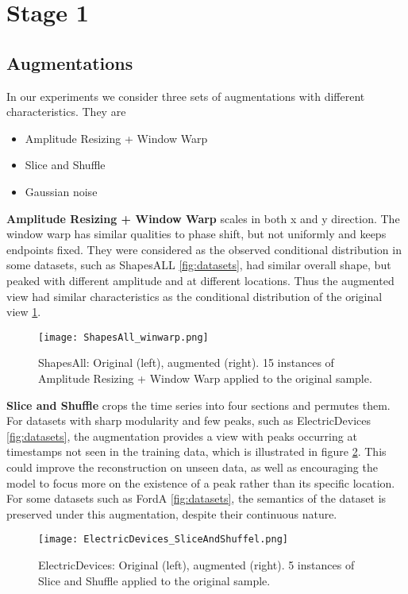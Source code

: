 \documentclass[../../thesis.tex]{subfiles}
\begin{document}
\section{Stage 1}


\subsection{Augmentations}
In our experiments we consider three sets of augmentations with different characteristics. They are
\begin{itemize}
    \item Amplitude Resizing + Window Warp
    \item Slice and Shuffle
    \item Gaussian noise
\end{itemize}

\textbf{Amplitude Resizing + Window Warp} scales in both x and y direction. The window warp has similar qualities to phase shift, but not uniformly and keeps endpoints fixed. They were considered as the observed conditional distribution in some datasets, such as ShapesALL \ref{fig:datasets}, had similar overall shape, but peaked with different amplitude and at different locations. Thus the augmented view had similar characteristics as the conditional distribution of the original view \ref{fig:ShapesAll_winwarp}. \newline

\begin{figure}[h]
    \centering
    \texttt{[image: ShapesAll\_winwarp.png]}
    \caption{ShapesAll: Original (left), augmented (right). 15 instances of Amplitude Resizing + Window Warp applied to the original sample.}
    \label{fig:ShapesAll_winwarp}
\end{figure}

\textbf{Slice and Shuffle} crops the time series into four sections and permutes them. For datasets with sharp modularity and few peaks, such as ElectricDevices \ref{fig:datasets}, the augmentation provides a view with peaks occurring at timestamps not seen in the training data, which is illustrated in figure \ref{fig:ElectricDevices_SliceAndShuffel}. This could improve the reconstruction on unseen data, as well as encouraging the model to focus more on the existence of a peak rather than its specific location. For some datasets such as FordA \ref{fig:datasets}, the semantics of the dataset is preserved under this augmentation, despite their continuous nature.\newline
\begin{figure}[h]
    \texttt{[image: ElectricDevices\_SliceAndShuffel.png]}
    \centering
    \caption{ElectricDevices: Original (left), augmented (right). 5 instances of Slice and Shuffle applied to the original sample.}
    \label{fig:ElectricDevices_SliceAndShuffel}
\end{figure}
\end{document}
